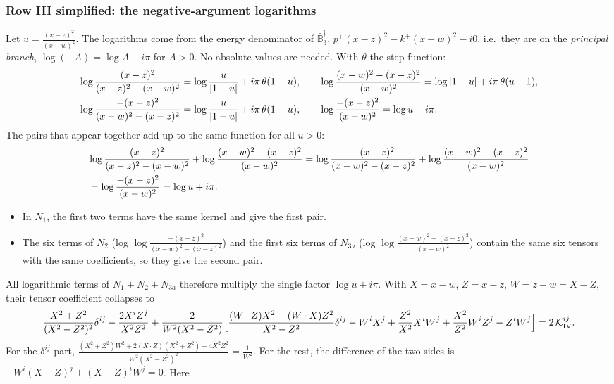 \documentclass[9pt]{article}
\numberwithin{equation}{section}
\begin{document}
{\subsubsection*{Row III simplified: the negative-argument logarithms}
Let $u=\frac{(x-z)^{2}}{(x-w)^{2}}$. The logarithms come from the energy denominator of $\bar{\mathbb B}_{3}^{\dagger}$, $p^{+}(x-z)^{2}-k^{+}(x-w)^{2}-i0$, i.e.\ they are on the \emph{principal branch}, $\log(-A)=\log A+i\pi$ for $A>0$. No absolute values are needed. With $\theta$ the step function:
\begin{align}
&\log\frac{(x-z)^{2}}{(x-z)^{2}-(x-w)^{2}}=\log\frac{u}{|1-u|}+i\pi\,\theta(1-u),\qquad
\log\frac{(x-w)^{2}-(x-z)^{2}}{(x-w)^{2}}=\log|1-u|+i\pi\,\theta(u-1),\notag\\
&\log\frac{-(x-z)^{2}}{(x-w)^{2}-(x-z)^{2}}=\log\frac{u}{|1-u|}+i\pi\,\theta(1-u),\qquad
\log\frac{-(x-z)^{2}}{(x-w)^{2}}=\log u+i\pi .
\end{align}
The pairs that appear together add up to the same function for all $u>0$:
\begin{align}
&\log\frac{(x-z)^{2}}{(x-z)^{2}-(x-w)^{2}}+\log\frac{(x-w)^{2}-(x-z)^{2}}{(x-w)^{2}}=\log\frac{-(x-z)^{2}}{(x-w)^{2}-(x-z)^{2}}+\log\frac{(x-w)^{2}-(x-z)^{2}}{(x-w)^{2}}\notag\\&=\log\frac{-(x-z)^{2}}{(x-w)^{2}}=\log u+i\pi .
\end{align}
\begin{itemize}
\item In $N_{1}$, the first two terms have the same kernel and give the first pair.
\item The six terms of $N_{2}$ (log $\log\frac{-(x-z)^{2}}{(x-w)^{2}-(x-z)^{2}}$) and the first six terms of $N_{3a}$ (log $\log\frac{(x-w)^{2}-(x-z)^{2}}{(x-w)^{2}}$) contain the same six tensors with the same coefficients, so they give the second pair.
\end{itemize}
All logarithmic terms of $N_{1}+N_{2}+N_{3a}$ therefore multiply the single factor $\log u+i\pi$. With $X=x-w$, $Z=x-z$, $W=z-w=X-Z$, their tensor coefficient collapses to
\begin{align}
\frac{X^{2}+Z^{2}}{(X^{2}-Z^{2})^{2}}\delta^{ij}-\frac{2X^{i}Z^{j}}{X^{2}Z^{2}}+\frac{2}{W^{2}(X^{2}-Z^{2})}\Big[\frac{(W\cdot Z)X^{2}-(W\cdot X)Z^{2}}{X^{2}-Z^{2}}\delta^{ij}-W^{i}X^{j}+\frac{Z^{2}}{X^{2}}X^{i}W^{j}+\frac{X^{2}}{Z^{2}}W^{i}Z^{j}-Z^{i}W^{j}\Big]=2\,\mathcal K^{ij}_{\rm IV}.
\end{align}
For the $\delta^{ij}$ part, $\frac{(X^{2}+Z^{2})W^{2}+2(X\cdot Z)(X^{2}+Z^{2})-4X^{2}Z^{2}}{W^{2}(X^{2}-Z^{2})^{2}}=\frac{1}{W^{2}}$. For the rest, the difference of the two sides is $-W^{i}(X-Z)^{j}+(X-Z)^{i}W^{j}=0$. Here
}
\end{document}
